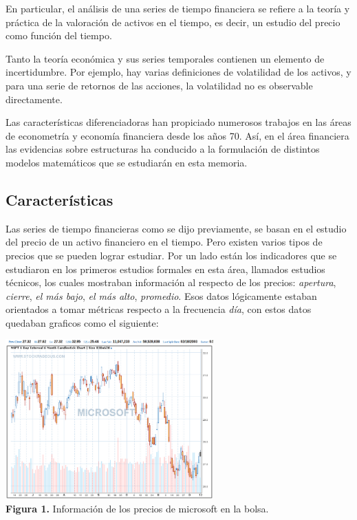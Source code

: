 En particular, el análisis de una series de tiempo financiera se refiere a la teoría y práctica de la valoración 
de activos en el tiempo, es decir, un estudio del precio como función del tiempo.

Tanto la teoría económica y sus series temporales contienen un elemento de incertidumbre. Por ejemplo, hay varias definiciones de volatilidad de los activos, 
y para una serie de retornos de las acciones, la volatilidad no es observable directamente.

Las características diferenciadoras han propiciado numerosos trabajos en las áreas de econometría y economía financiera desde los años 70.
Así, en el área financiera las evidencias sobre estructuras ha conducido a la formulación de distintos modelos matemáticos que se estudiarán
en esta memoria.

\subsection{Características}

Las series de tiempo financieras como se dijo previamente, se basan en el estudio del precio de un activo financiero en el tiempo. Pero existen 
varios tipos de precios que se pueden lograr estudiar. Por un lado están los indicadores que se estudiaron en los primeros estudios formales
en esta área, llamados estudios técnicos, los cuales mostraban información al respecto de los precios: \emph{apertura}, \emph{cierre}, \emph{el más bajo}, 
\emph{el más alto}, \emph{promedio}. Esos datos lógicamente estaban orientados a tomar métricas respecto a la frecuencia \emph{día}, con estos
datos quedaban graficos como el siguiente:

\begin{center}
	\includegraphics[width=0.6\textwidth]{images/microsoft} \\
	\textbf{Figura 1.} Información de los precios de microsoft en la bolsa.
\end{center}

